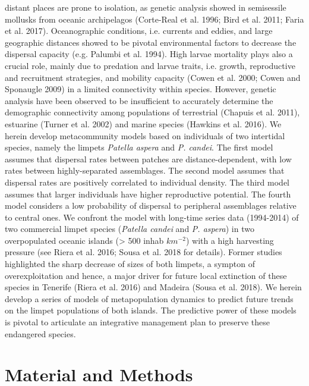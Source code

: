 \documentclass[12pt]{article}
\begin{document}
distant places are prone to isolation, as genetic analysis showed in
semisessile mollusks from oceanic archipelagos (Corte-Real et
al. 1996; Bird et al. 2011; Faria et al. 2017). Oceanographic
conditions, i.e. currents and eddies, and large geographic distances
showed to be pivotal environmental factors to decrease the dispersal
capacity (e.g. Palumbi et al. 1994). High larvae mortality plays also
a crucial role, mainly due to predation and larvae traits,
i.e. growth, reproductive and recruitment strategies, and mobility
capacity (Cowen et al. 2000; Cowen and Sponaugle 2009) in a limited
connectivity within species. However, genetic analysis have been
observed to be insufficient to accurately determine the demographic
connectivity among populations of terrestrial (Chapuis et al. 2011),
estuarine (Turner et al. 2002) and marine species (Hawkins et
al. 2016).  We herein develop metacommunity models based on
individuals of two intertidal species, namely the limpets
\textit{Patella aspera} and \textit{P. candei}. The first model
assumes that dispersal rates between patches are distance-dependent,
with low rates between highly-separated assemblages. The second model
assumes that dispersal rates are positively correlated to individual
density. The third model assumes that larger individuals have higher
reproductive potential. The fourth model considers a low probability
of dispersal to peripheral assemblages relative to central ones. We
confront the model with long-time series data (1994-2014) of two
commercial limpet species (\textit{Patella candei} and
\textit{P. aspera}) in two overpopulated oceanic islands (> 500 inhab
$km^{-2}$) with a high harvesting pressure (see Riera et al. 2016; Sousa
et al. 2018 for details). Former studies highlighted the sharp
decrease of sizes of both limpets, a sympton of overexploitation and
hence, a major driver for future local extinction of these species in
Tenerife (Riera et al. 2016) and Madeira (Sousa et al. 2018). We
herein develop a series of models of metapopulation dynamics to
predict future trends on the limpet populations of both islands. The
predictive power of these models is pivotal to articulate an
integrative management plan to preserve these endangered species.

\section{Material and Methods}

\end{document}
